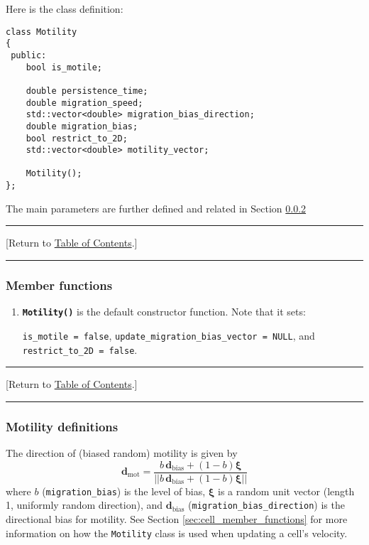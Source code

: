 \documentclass[12pt]{article}
\renewcommand{\vec}[1]{\mathbf{#1}}
\newcommand{\norm}[1]{\left|\left|{#1}\right|\right|}
\newcommand{\beq}{\begin{equation}}
\newcommand{\eeq}{\end{equation}}
\newcommand{\grvec}[1]{\boldsymbol{#1}}
\renewcommand{\v}{\verb}
\newcommand{\smallcode}[1]{\textbf{\texttt{#1}}}
\newcommand{\TOClink}{\begin{center}\hrule\vskip-10pt\phantom{.}\hfill[Return to \hyperlink{TOC}{Table of Contents}.]\hfill\phantom{.}\vskip3pt\hrule\end{center}}
\begin{document}
Here is the class definition: 
\begin{verbatim}
class Motility
{
 public:
    bool is_motile; 
 
    double persistence_time; 
    double migration_speed;     
    std::vector<double> migration_bias_direction; 
    double migration_bias; 
    bool restrict_to_2D; 
    std::vector<double> motility_vector; 
        
    Motility();      
};
\end{verbatim}
The main parameters are further defined and related in Section \ref{sec:motility_definitions}

\TOClink

\subsubsection{Member functions}
\begin{enumerate}
\item 
\smallcode{Motility()} is the default constructor function. Note that it sets: 

\v|is_motile = false|, \break
\v|update_migration_bias_vector = NULL|, and \hfill\break
\v|restrict_to_2D = false|. 

\end{enumerate}

\TOClink

\subsubsection{Motility definitions}
\label{sec:motility_definitions}

The direction of (biased random) motility is given by 
\beq
\vec{d}_\textrm{mot} = 
\frac{ b \, \vec{d}_\textrm{bias} + (1-b) \grvec{\xi} }{ \norm{  b \, \vec{d}_\textrm{bias} + (1-b) \grvec{\xi} } }
\label{eq:motility_direction}
\eeq
where $b$ (\v|migration_bias|) is the level of bias, 
$\grvec{\xi}$ is a random unit vector (length 1, uniformly random direction), 
and $\vec{d}_\textrm{bias}$ (\v|migration_bias_direction|) is the directional bias for motility. 
See Section \ref{sec:cell_member_functions} for more information on how the 
\v|Motility| class is used when updating a cell's velocity. 
\end{document}
